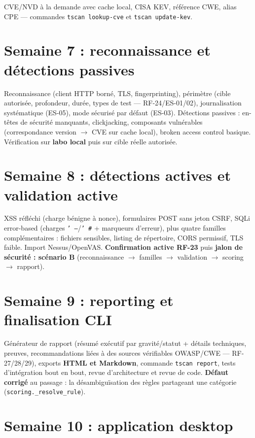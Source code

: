 \documentclass[11pt,a4paper]{report}
\newcommand{\code}[1]{\texttt{#1}}
\begin{document}
CVE/NVD à la demande avec cache local, CISA KEV, référence CWE, alias CPE --- commandes
\code{tscan lookup-cve} et \code{tscan update-kev}.

\section{Semaine 7 : reconnaissance et détections passives}

Reconnaissance (client HTTP borné, TLS, fingerprinting), périmètre (cible autorisée,
profondeur, durée, types de test --- RF-24/ES-01/02), journalisation systématique (ES-05),
mode sécurisé par défaut (ES-03). Détections passives : en-têtes de sécurité manquants,
clickjacking, composants vulnérables (correspondance version $\rightarrow$ CVE sur cache
local), broken access control basique. Vérification sur \textbf{labo local} puis sur cible
réelle autorisée.

\section{Semaine 8 : détections actives et validation active}

XSS réfléchi (charge bénigne à nonce), formulaires POST sans jeton CSRF, SQLi error-based
(charges \code{' --}/\code{' \#} + marqueurs d'erreur), plus quatre familles
complémentaires : fichiers sensibles, listing de répertoire, CORS permissif, TLS faible.
Import Nessus/OpenVAS. \textbf{Confirmation active RF-23} puis \textbf{jalon de sécurité :
scénario B} (reconnaissance $\rightarrow$ familles $\rightarrow$ validation $\rightarrow$
scoring $\rightarrow$ rapport).

\section{Semaine 9 : reporting et finalisation CLI}

Générateur de rapport (résumé exécutif par gravité/statut + détails techniques, preuves,
recommandations liées à des sources vérifiables OWASP/CWE --- RF-27/28/29), exports
\textbf{HTML et Markdown}, commande \code{tscan report}, tests d'intégration bout en bout,
revue d'architecture et revue de code. \textbf{Défaut corrigé} au passage : la
désambiguïsation des règles partageant une catégorie (\code{scoring.\_resolve\_rule}).

\section{Semaine 10 : application desktop}
\end{document}
